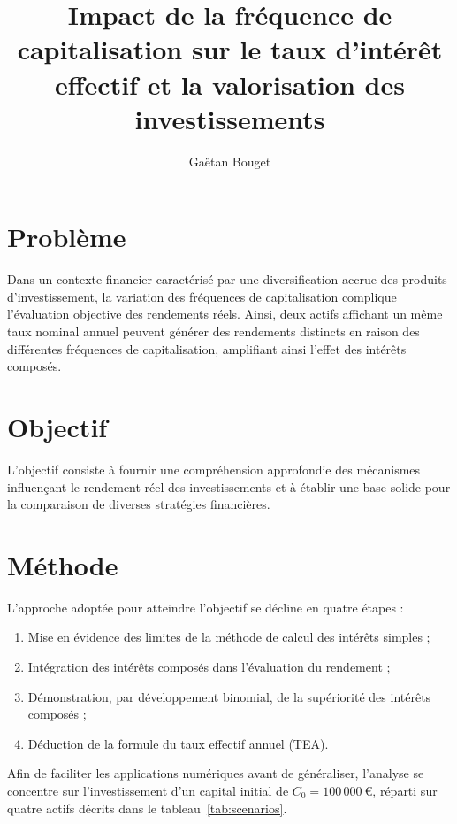 \documentclass{article}
\title{Impact de la fréquence de capitalisation sur le taux d'intérêt effectif et la valorisation des investissements}
\author{Gaëtan Bouget}
\begin{document}
\maketitle

\section{Problème}
Dans un contexte financier caractérisé par une diversification accrue des produits d’investissement, la variation des fréquences de capitalisation complique l’évaluation objective des rendements réels. Ainsi, deux actifs affichant un même taux nominal annuel peuvent générer des rendements distincts en raison des différentes fréquences de capitalisation, amplifiant ainsi l'effet des intérêts composés.

\section{Objectif}
L'objectif consiste à fournir une compréhension approfondie des mécanismes influençant le rendement réel des investissements et à établir une base solide pour la comparaison de diverses stratégies financières.

\section{Méthode}
L'approche adoptée pour atteindre l'objectif se décline en quatre étapes :
\begin{enumerate}
    \item Mise en évidence des limites de la méthode de calcul des intérêts simples ;
    \item Intégration des intérêts composés dans l'évaluation du rendement ;
    \item Démonstration, par développement binomial, de la supériorité des intérêts composés ;
    \item Déduction de la formule du taux effectif annuel (TEA).
\end{enumerate}

Afin de faciliter les applications numériques avant de généraliser, l'analyse se concentre sur l'investissement d'un capital initial de \( C_0 = 100\,000\ \text{€} \), réparti sur quatre actifs décrits dans le tableau~\ref{tab:scenarios}.
\end{document}
